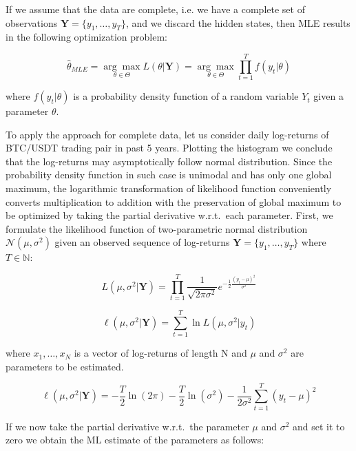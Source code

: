 If we assume that the data are complete, i.e. we have a complete set of observations $\textbf{Y} = \{y_1,\ldots,y_T\}$, and we discard the hidden states, 
then MLE results in the following optimization problem: 

\begin{equation}
    \hat{\theta}_{MLE} = \underset{\theta \in \Theta}{\arg\max} L(\theta|\textbf{Y}) = \underset{\theta \in \Theta}{\arg\max} \prod_{t=1}^{T} f(y_t|\theta)
\end{equation}

where $f(y_t|\theta)$ is a probability density function of a random variable $Y_t$ given a parameter $\theta$.

To apply the approach for complete data, let us consider daily log-returns of BTC/USDT trading pair in past 5 years. 
Plotting the histogram we conclude that the log-returns may asymptotically follow normal distribution. 
Since the probability density function in such case is unimodal and has only one global maximum, 
the logarithmic transformation of likelihood function conveniently converts multiplication to addition with the 
preservation of global maximum to be optimized by taking the partial derivative w.r.t.\ each parameter. 
First, we formulate the likelihood function of two-parametric normal distribution $\mathcal{N}(\mu,\sigma^2)$ given an observed sequence 
of log-returns $\textbf{Y} = \{y_1,\ldots,y_T\}$ where $T \in \mathbb{N}$:
 
\begin{equation}
    L(\mu,\sigma^2|\textbf{Y}) = \prod_{t=1}^{T} \frac{1}{\sqrt{2\pi \sigma^2}} e^{-\frac{1}{2} \frac{{(y_t-\mu)}^2}{\sigma^2}}
\end{equation}

\begin{equation}
    \ell(\mu,\sigma^2|\textbf{Y}) = \sum_{t=1}^{T} \ln L(\mu,\sigma^2|y_t) 
\end{equation}

where $x_1,\ldots,x_N$ is a vector of log-returns of length N and $\mu$ and $\sigma^2$ are parameters to be estimated. 

\begin{equation}
    \ell(\mu,\sigma^2|\textbf{Y}) = -\frac{T}{2} \ln(2 \pi) - \frac{T}{2} \ln(\sigma^2) - \frac{1}{2 \sigma^2} \sum_{t=1}^{T} {(y_t - \mu)}^2
\end{equation}

If we now take the partial derivative w.r.t.\ the parameter $\mu$ and $\sigma^2$ and set it to zero we obtain the ML estimate of the 
parameters as follows:

